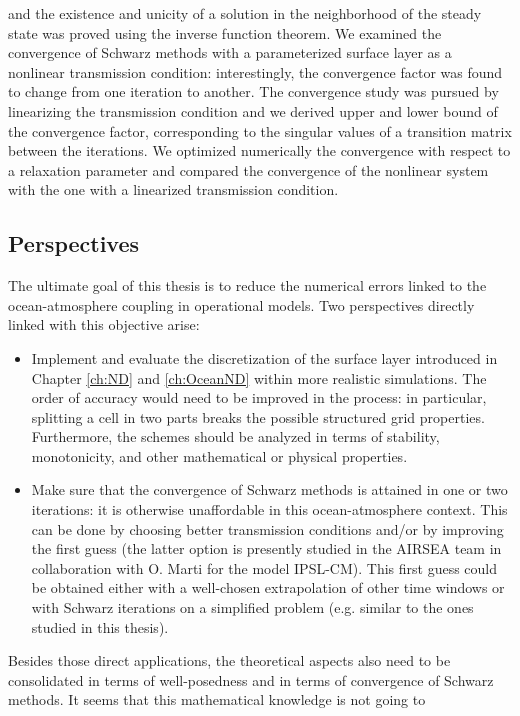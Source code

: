and the existence and unicity of a solution in the neighborhood
of the steady state was proved using the inverse function theorem.
We examined the convergence of Schwarz methods with a parameterized
surface layer as a nonlinear transmission condition:
interestingly, the convergence factor was found to change from
one iteration to another.
The convergence study was pursued by linearizing the transmission
condition and we derived upper and lower bound of the
convergence factor,
corresponding to the singular values of a transition matrix between
the iterations.
We optimized numerically the convergence with respect to a relaxation
parameter and compared the convergence of the nonlinear system
with the one with a linearized transmission condition.
\subsection*{Perspectives}
The ultimate goal of this thesis is
to reduce the numerical errors linked to the ocean-atmosphere
coupling in operational models. Two perspectives
directly linked with this objective arise:
\begin{itemize}
	\item Implement and evaluate the discretization of the
		surface layer introduced in Chapter \ref{ch:ND} and
	\ref{ch:OceanND} within more realistic simulations.
	The order of accuracy would need to be improved in the
	process: in particular, splitting a cell in two parts
	breaks the possible structured grid properties.
	Furthermore, the schemes should be analyzed in terms of
	stability, monotonicity, and other mathematical or physical
		properties.
	\item Make sure that the convergence of Schwarz methods
	is attained in one or two iterations: it is
	otherwise unaffordable in this ocean-atmosphere context.
	This can be done by choosing better transmission
	conditions and/or by improving the first guess
	(the latter option
	is presently studied in the AIRSEA team in collaboration
	with O. Marti for the model IPSL-CM).
	This first guess could be obtained either with a
	well-chosen extrapolation of other time windows or
	with Schwarz iterations on a simplified problem (e.g.
	similar to the ones studied in this thesis).
\end{itemize}
\par
Besides those direct applications, the theoretical aspects
also need to be consolidated in terms of well-posedness
and in terms of convergence of Schwarz methods.
It seems that this mathematical knowledge is not going to
